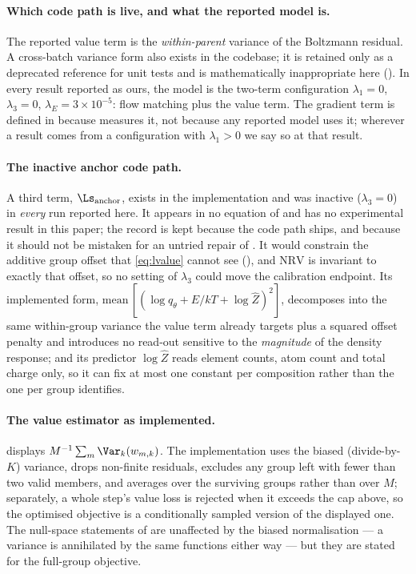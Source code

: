 \paragraph{Which code path is live, and what the reported model is.} The reported
value term is the \emph{within-parent} variance of the Boltzmann residual. A
cross-batch variance form also exists in the codebase; it is retained only as a
deprecated reference for unit tests and is mathematically inappropriate here
(). In every result reported as ours, the model is the
two-term configuration $\lambda_1 = 0$, $\lambda_3 = 0$,
$\lambda_E = 3\times10^{-5}$: flow matching plus the value term. The gradient term
is defined in  because  measures it, not
because any reported model uses it; wherever a result comes from a configuration
with $\lambda_1 > 0$ we say so at that result.

\paragraph{The inactive anchor code path.} A third term, $\Ls_{\mathrm{anchor}}$,
exists in the implementation and was inactive ($\lambda_3 = 0$) in \emph{every} run
reported here. It appears in no equation of  and has no experimental
result in this paper; the record is kept because the code path ships, and because it
should not be mistaken for an untried repair of . It would constrain
the additive group offset that \eqref{eq:lvalue} cannot see (), and
$\mathrm{NRV}$ is invariant to exactly that offset, so no setting of $\lambda_3$ could
move the calibration endpoint. Its implemented form,
$\mathrm{mean}\,[(\log q_\theta + E/kT + \log \hat Z)^2]$, decomposes into the same
within-group variance the value term already targets plus a squared offset penalty and
introduces no read-out sensitive to the \emph{magnitude} of the density response; and
its predictor $\log \hat Z$ reads element counts, atom count and total charge only, so
it can fix at most one constant per composition rather than the one per group
 identifies.

\paragraph{The value estimator as implemented.}  displays
$M^{-1}\sum_m \Var_k(w_{m,k})$. The implementation uses the biased
(divide-by-$K$) variance, drops non-finite residuals, excludes any group left with
fewer than two valid members, and averages over the surviving groups rather than
over $M$; separately, a whole step's value loss is rejected when it exceeds the cap
above, so the optimised objective is a conditionally sampled version of the
displayed one. The null-space statements of  are
unaffected by the biased normalisation --- a variance is annihilated by the same
functions either way --- but they are stated for the full-group objective.

